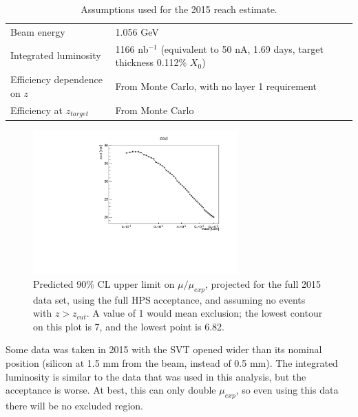 \begin{table}[ht]
    \begin{center}
        \caption{Assumptions used for the 2015 reach estimate.}
        \begin{tabular}{lp{}}
            \hline \hline
            Beam energy & 1.056 GeV \\
            Integrated luminosity & 1166 nb$^{-1}$ (equivalent to 50 nA, 1.69 days, target thickness 0.112\% $X_0$) \\
            Efficiency dependence on $z$ & From Monte Carlo, with no layer 1 requirement \\
            Efficiency at $z_{target}$ & From Monte Carlo \\
            \hline \hline
        \end{tabular}
        \label{tab:reach_assumptions} 
    \end{center}
\end{table}

\begin{figure}[ht]
\begin{center}
    \includegraphics[width=0.7\textwidth,page=15,angle=-90]{vertexing/figs/golden_fullset_mres_allayers_nosignal_output}
\end{center}
\caption{Predicted 90\% CL upper limit on $\mu/\mu_{exp}$, projected for the full 2015 data set, using the full HPS acceptance, and assuming no events with $z>z_{cut}$. A value of 1 would mean exclusion; the lowest contour on this plot is 7, and the lowest point is 6.82.}
    \label{fig:upper_limit_fullset_alllayers}
\end{figure}

Some data was taken in 2015 with the SVT opened wider than its nominal position (silicon at 1.5 mm from the beam, instead of 0.5 mm).
The integrated luminosity is similar to the data that was used in this analysis, but the acceptance is worse.
At best, this can only double $\mu_{exp}$, so even using this data there will be no excluded region.

